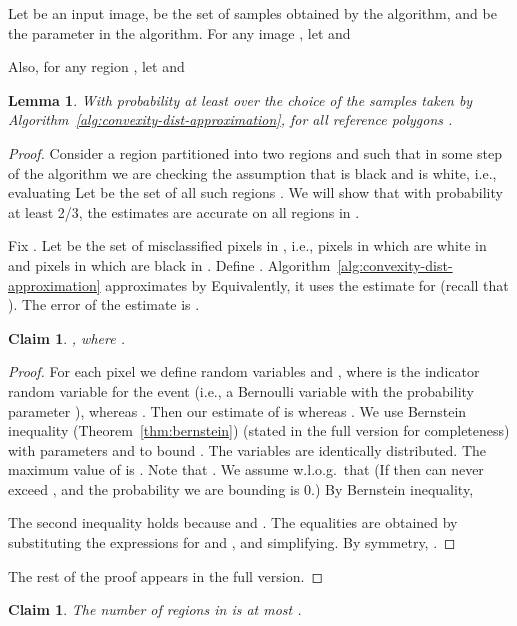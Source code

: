 \documentclass[11pt,english]{article}
\newtheorem{lemma}[theorem]{Lemma}
\newtheorem{claim}[theorem]{Claim}
\numberwithin{figure}{section}
\begin{document}
Let  be an input image,  be the set of samples obtained by the algorithm, and  be the parameter in the algorithm.
For any image , let  and

Also, for any region , let 
and 
\fi

\begin{lemma}\label{lem:accuracy-on-ref-polygons}
With probability at least  over the choice of the samples taken by Algorithm~\ref{alg:convexity-dist-approximation},
 for all reference polygons .
\end{lemma}
\begin{proof}

Consider a region  partitioned into two regions  and  such that in some step of the algorithm we are checking the assumption that  is black and  is white, i.e., evaluating  Let  be the set of all such regions . We will show that with probability at least 2/3, the estimates  are accurate on all regions in .

Fix . Let  be the set of misclassified pixels in , i.e., pixels in  which are white in  and pixels in  which are black in . Define . Algorithm~\ref{alg:convexity-dist-approximation} approximates  by  Equivalently, it uses the estimate  for  (recall that ). The error of the estimate is .

\begin{claim}\label{claim:error-for-R}
, where .
\end{claim}

\begin{proof}
For each pixel  we define random variables  and ,
where  is the indicator random variable for the event  (i.e., a Bernoulli variable with the probability parameter ), whereas .
Then our estimate of  is  whereas
. We use Bernstein inequality
\ifnum{}
(Theorem~\ref{thm:bernstein})
\else
(stated in the {\color{black} full version} for completeness)
\fi
with parameters
 and  to bound .
The variables  are identically distributed. The maximum value of  is . Note that
.
We assume w.l.o.g.\ that  (If  then  can never exceed , and the probability we are bounding is 0.)
By Bernstein inequality,


The second inequality holds because  and .
The equalities are obtained by substituting the expressions for  and , and simplifying.
By symmetry, .
\end{proof}
\ifnum{}
The rest of the proof appears in the {\color{black} full version}.
\end{proof}
\else
\begin{claim}\label{claim:convexity-approx-regions-count}
The number of regions in  is at most .
\end{claim}
\end{document}

